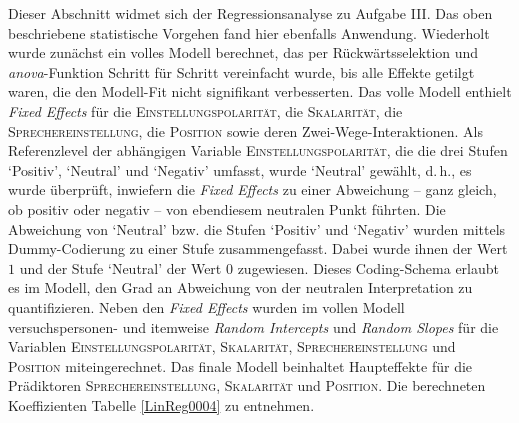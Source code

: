 Dieser Abschnitt widmet sich der Regressionsanalyse zu Aufgabe III. 
Das oben beschriebene statistische Vorgehen fand hier ebenfalls Anwendung. Wiederholt wurde zunächst ein volles Modell berechnet, das per Rückwärtsselektion und \textit{anova}-Funktion Schritt für Schritt vereinfacht wurde, bis alle Effekte getilgt waren, die den Modell-Fit nicht signifikant verbesserten. Das volle Modell enthielt \textit{Fixed Effects} für die \textsc{Einstellungspolarität}, die \textsc{Skalarität}, die \textsc{Sprechereinstellung}, die \textsc{Position} sowie deren Zwei-Wege-Interaktionen. Als Referenzlevel der abhängigen Variable \textsc{Einstellungspolarität}, die die drei Stufen `Positiv', `Neutral' und `Negativ' umfasst, wurde `Neutral' gewählt, d.\,h., es wurde überprüft, inwiefern die \textit{Fixed Effects} zu einer Abweichung -- ganz gleich, ob positiv oder negativ -- von ebendiesem neutralen Punkt führten. Die Abweichung von `Neutral' bzw. die Stufen `Positiv' und `Negativ' wurden mittels Dummy-Codierung zu einer Stufe zusammengefasst. Dabei wurde ihnen der Wert $1$ und der Stufe `Neutral' der Wert $0$ zugewiesen. Dieses Coding-Schema erlaubt es im Modell, den Grad an Abweichung von der neutralen Interpretation zu quantifizieren. Neben den \textit{Fixed Effects}  wurden im vollen Modell versuchspersonen- und itemweise \textit{Random Intercepts} und \textit{Random Slopes} für die Variablen \textsc{Einstellungspolarität}, \textsc{Skalarität}, \textsc{Sprechereinstellung} und \textsc{Position} miteingerechnet. Das finale Modell beinhaltet Haupteffekte für die Prädiktoren \textsc{Sprechereinstellung}, \textsc{Skalarität} und \textsc{Position}. Die berechneten Koeffizienten {Tabelle \ref{LinReg0004}} zu entnehmen.


